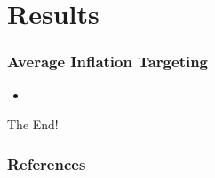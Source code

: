 \documentclass{beamer}
\begin{document}
\section*{Results}

\begin{frame}
	\frametitle{Average Inflation Targeting}
	\begin{itemize}
		\item 
	\end{itemize}
\end{frame}

\begin{frame}
	\centering
	The End!
\end{frame}

\begin{frame}[allowframebreaks]
	\frametitle{References}
	
	
\end{frame}
\end{document}
